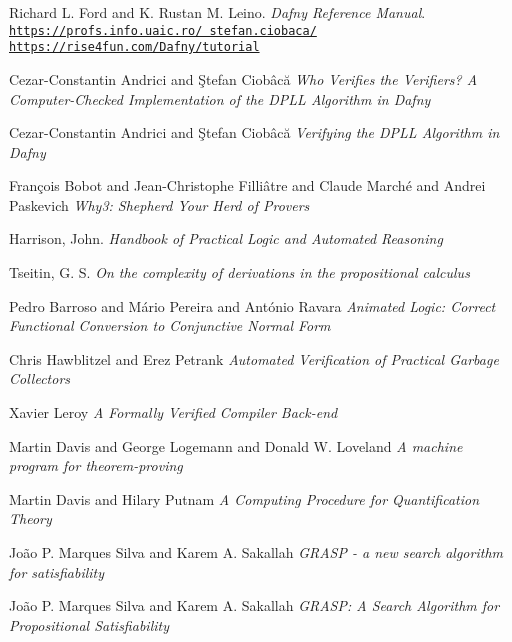\begin{thebibliography}{9}
 Richard L. Ford and K. Rustan M. Leino. \textit{Dafny Reference Manual}.
 \texttt{\href{https://profs.info.uaic.ro/~stefan.ciobaca/}{https://profs.info.uaic.ro/~stefan.ciobaca/}}
 \texttt{\href{https://rise4fun.com/Dafny/tutorial}{https://rise4fun.com/Dafny/tutorial}}

 Cezar{-}Constantin Andrici and
{\c{S}}tefan Ciob{\^{a}}c{\u{a}} \textit{Who Verifies the Verifiers? {A} Computer-Checked Implementation of the {DPLL} Algorithm in {D}afny}


 Cezar{-}Constantin Andrici and
{\c{S}}tefan Ciob{\^{a}}c{\u{a}} \textit{Verifying the {DPLL} Algorithm in {D}afny}

 Fran\c{c}ois Bobot and Jean-Christophe Filli\^atre and
Claude March\'e and Andrei Paskevich \textit{Why3: Shepherd Your Herd of Provers}

 Harrison, John. \textit{Handbook of Practical Logic and Automated Reasoning}

 Tseitin, G. S. \textit{On the complexity of derivations in the propositional calculus}

 Pedro Barroso and
M{\'{a}}rio Pereira and
Ant{\'{o}}nio Ravara \textit{Animated Logic: Correct Functional Conversion to Conjunctive Normal
Form}

Chris Hawblitzel and Erez Petrank 
\textit{Automated Verification of Practical Garbage Collectors}

Xavier Leroy
\textit{A Formally Verified Compiler Back-end}

Martin Davis and
               George Logemann and
               Donald W. Loveland
\textit{A machine program for theorem-proving}

Martin Davis and
               Hilary Putnam
\textit{A Computing Procedure for Quantification Theory}

Jo{\~{a}}o P. {Marques Silva} and
               Karem A. Sakallah
\textit{{GRASP} - a new search algorithm for satisfiability}

Jo{\~{a}}o P. {Marques Silva} and
               Karem A. Sakallah
\textit{{GRASP:} {A} Search Algorithm for Propositional Satisfiability}


\end{thebibliography}
